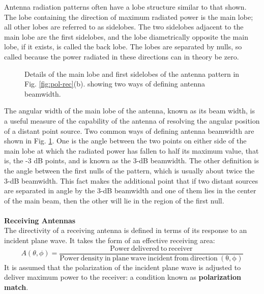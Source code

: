 Antenna radiation patterns often have a lobe structure similar to that shown. The lobe containing the direction of maximum radiated power is the main lobe; all other lobes are referred to as sidelobes. The two sidelobes adjacent to the main lobe are the first sidelobes, and the lobe diametrically opposite the main lobe, if it exists, is called the back lobe. The lobes are separated by nulls, so called because the power radiated in these directions can in theory be zero.
\begin{figure}[htbp]
	\begin{center}
	\end{center}
	\caption{Details of the main lobe and first sidelobes of the antenna pattern in Fig. \ref{fig:pol-rec}(b). showing two ways of defining antenna beamwidth.} 
	\label{fig:lobes}
\end{figure}
The angular width of the main lobe of the antenna, known as its beam width, is a useful measure of the capability of the antenna of resolving the angular position of a distant point source. Two common ways of defining antenna beamwidth are shown in Fig. \ref{fig:lobes}. One is the angle between the two points on either side of the main lobe at which the radiated power has fallen to half its maximum value, that is, the -3 dB points, and is known as the 3-dB beamwidth. The other definition is the angle between the first nulls of the pattern, which is usually about twice the 3-dB beamwidth. This fact makes the additional point that if two distant sources are separated in angle by the 3-dB beamwidth and one of them lies in the center of the main beam, then the other will lie in the region of the first null.\\
\\
\textbf{Receiving Antennas}\\
The directivity of a receiving antenna is defined in terms of its response to an incident plane wave. It takes the form of an effective receiving area:
\begin{equation}
A(\theta,\phi)=\frac{\mathrm{Power\ delivered\ to\ receiver}}{\mathrm{Power\ density\ in\ plane\ wave\ incident\ from\ direction\ (\theta,\phi)}}
\end{equation}
It is assumed that the polarization of the incident plane wave is adjusted to deliver maximum power to the receiver: a condition known as \textbf{polarization match}.

